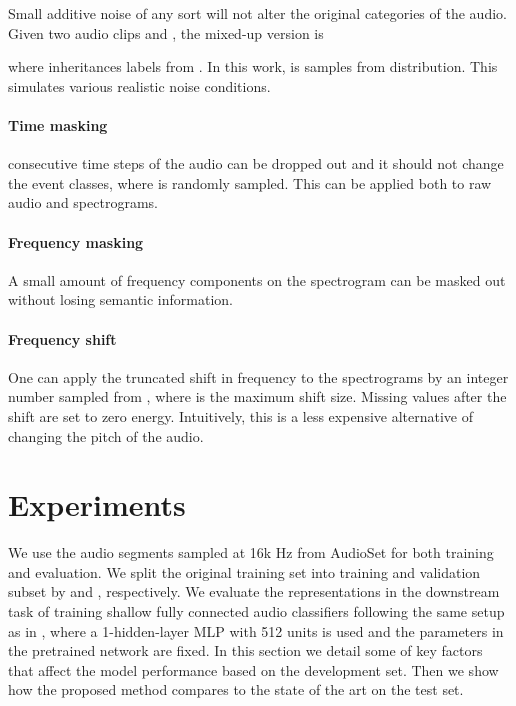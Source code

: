 \documentclass{article}
\begin{document}
Small additive noise of any sort will not alter the original categories of the audio. Given two audio clips  and , the mixed-up version is



where  inheritances labels from . In this work,  is samples from  distribution. This simulates various realistic noise conditions.

\paragraph{Time masking}

 consecutive time steps  of the audio can be dropped out and it should not change the event classes, where  is randomly sampled. This can be applied both to raw audio and spectrograms.

\paragraph{Frequency masking}

A small amount of  frequency components  on the spectrogram can be masked out without losing semantic information.

\paragraph{Frequency shift}

One can apply the truncated shift in frequency to the spectrograms by an integer number sampled from , where  is the maximum shift size. Missing values after the shift are set to zero energy. Intuitively, this is a less expensive alternative of changing the pitch of the audio.

\section{Experiments}
\label{experiments}

We use the audio segments sampled at 16k Hz from AudioSet \cite{gemmeke2017audio} for both training and evaluation. We split the original training set into training and validation subset by  and , respectively. We evaluate the representations in the downstream task of training shallow fully connected audio classifiers following the same setup as in \cite{jansen2018unsupervised, jansen2019coincidence}, where a 1-hidden-layer MLP with 512 units is used and the parameters in the pretrained network are fixed. In this section we detail some of key factors that affect the model performance based on the development set. Then we show how the proposed method compares to the state of the art on the test set. 
\end{document}
